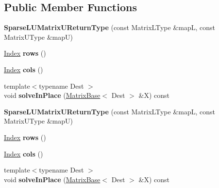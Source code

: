\subsection*{Public Member Functions}
\begin{DoxyCompactItemize}
\item 
\mbox{\label{struct_eigen_1_1_sparse_l_u_matrix_u_return_type_a6d2a7de76dc233c14d6e07a13566417e}} 
{\bfseries Sparse\+L\+U\+Matrix\+U\+Return\+Type} (const Matrix\+L\+Type \&mapL, const Matrix\+U\+Type \&mapU)
\item 
\mbox{\label{struct_eigen_1_1_sparse_l_u_matrix_u_return_type_ad990ba846aca9d220361cbd95f675d40}} 
\hyperlink{namespace_eigen_a62e77e0933482dafde8fe197d9a2cfde}{Index} {\bfseries rows} ()
\item 
\mbox{\label{struct_eigen_1_1_sparse_l_u_matrix_u_return_type_a105fbf78cea564052da04e32bbc5c450}} 
\hyperlink{namespace_eigen_a62e77e0933482dafde8fe197d9a2cfde}{Index} {\bfseries cols} ()
\item 
\mbox{\label{struct_eigen_1_1_sparse_l_u_matrix_u_return_type_aa32c47f4e184a041db3c4112339d3185}} 
{\footnotesize template$<$typename Dest $>$ }\\void {\bfseries solve\+In\+Place} (\hyperlink{group___core___module_class_eigen_1_1_matrix_base}{Matrix\+Base}$<$ Dest $>$ \&X) const
\item 
\mbox{\label{struct_eigen_1_1_sparse_l_u_matrix_u_return_type_a6d2a7de76dc233c14d6e07a13566417e}} 
{\bfseries Sparse\+L\+U\+Matrix\+U\+Return\+Type} (const Matrix\+L\+Type \&mapL, const Matrix\+U\+Type \&mapU)
\item 
\mbox{\label{struct_eigen_1_1_sparse_l_u_matrix_u_return_type_ad990ba846aca9d220361cbd95f675d40}} 
\hyperlink{namespace_eigen_a62e77e0933482dafde8fe197d9a2cfde}{Index} {\bfseries rows} ()
\item 
\mbox{\label{struct_eigen_1_1_sparse_l_u_matrix_u_return_type_a105fbf78cea564052da04e32bbc5c450}} 
\hyperlink{namespace_eigen_a62e77e0933482dafde8fe197d9a2cfde}{Index} {\bfseries cols} ()
\item 
\mbox{\label{struct_eigen_1_1_sparse_l_u_matrix_u_return_type_aa32c47f4e184a041db3c4112339d3185}} 
{\footnotesize template$<$typename Dest $>$ }\\void {\bfseries solve\+In\+Place} (\hyperlink{group___core___module_class_eigen_1_1_matrix_base}{Matrix\+Base}$<$ Dest $>$ \&X) const
\end{DoxyCompactItemize}
